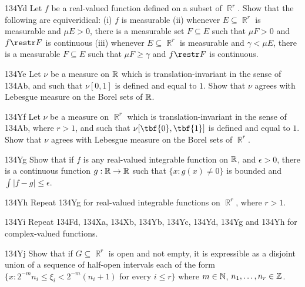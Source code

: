 {\spheader 134Yd Let $f$ be a real-valued function defined on a
subset of $\BbbR^r$.   Show that the
following are equiveridical:   (i) $f$ is measurable (ii)
whenever $E\subseteq\BbbR^r$ is measurable and $\mu E>0$, there is a
measurable set $F\subseteq E$ such that $\mu F>0$ and $f\restr F$ is
continuous (iii) whenever $E\subseteq\BbbR^r$ is measurable and
$\gamma<\mu E$, there is a measurable $F\subseteq E$ such that
$\mu F\ge\gamma$ and $f\restr F$ is continuous.   
     
\spheader 134Ye Let $\nu$ be a measure on $\Bbb R$ which is
translation-invariant in the sense of 134Ab, and such that $\nu[0,1]$ is
defined and equal to $1$.   Show that $\nu$ agrees with Lebesgue measure
on the Borel sets of $\Bbb R$.   
     
\spheader 134Yf Let $\nu$ be a measure on $\BbbR^r$ which is
translation-invariant in the sense of 134Ab, where $r>1$, and such that
$\nu[\tbf{0},\tbf{1}]$ is
defined and equal to $1$.   Show that $\nu$ agrees with Lebesgue measure
on the Borel sets of $\BbbR^r$.
     
\spheader 134Yg Show that if $f$ is any real-valued integrable
function on $\Bbb R$, and $\epsilon>0$, there is a continuous function
$g:\Bbb R\to\Bbb R$ such that $\{x:g(x)\ne 0\}$ is bounded and
$\int|f-g|\le\epsilon$.   
     
\spheader 134Yh Repeat 134Yg for real-valued integrable
functions on $\BbbR^r$, where $r>1$.
     
\spheader 134Yi Repeat 134Fd, 134Xa, 134Xb, 134Yb, 134Yc, 134Yd, 134Yg
and 134Yh for complex-valued functions.
     
     
\spheader 134Yj Show that if $G\subseteq\BbbR^r$ is open and not empty,
it is expressible as a disjoint union of a sequence of half-open
intervals each of the form $\{x:2^{-m}n_i\le\xi_i<2^{-m}(n_i+1)$ for
every $i\le r\}$ where $m\in\Bbb N$, $n_1,\ldots,n_r\in\Bbb Z$.
     
}
